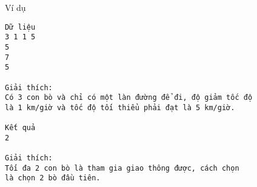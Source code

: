 Ví dụ
\begin{verbatim}
Dữ liệu
3 1 1 5
5
7
5

Giải thích:
Có 3 con bò và chỉ có một làn đường để đi, độ giảm tốc độ 
là 1 km/giờ và tốc độ tối thiểu phải đạt là 5 km/giờ.

Kết quả
2

Giải thích:
Tối đa 2 con bò là tham gia giao thông được, cách chọn 
là chọn 2 bò đầu tiên.
\end{verbatim}